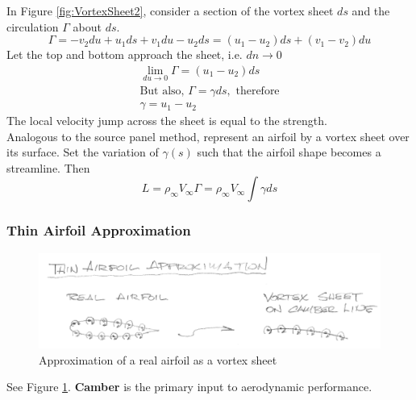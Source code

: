 \documentclass[draft=false, titlepage]{article}
\begin{document}

In Figure \ref{fig:VortexSheet2}, consider a section of the vortex sheet $ds$ and the circulation $\Gamma$ about $ds$.
\begin{equation*}
    \Gamma = -v_2du + u_1ds + v_1du - u_2ds = (u_1-u_2)ds + (v_1-v_2)du
\end{equation*}
Let the top and bottom approach the sheet, i.e. $dn \rightarrow 0$
\begin{gather*}
    \lim\limits_{du \rightarrow 0} \Gamma = (u_1-u_2)ds\\
    \text{But also, } \Gamma = \gamma ds, \text{ therefore}\\
    \gamma = u_1-u_2
\end{gather*}
The local velocity jump across the sheet is equal to the strength.\\
Analogous to the source panel method, represent an airfoil by a vortex sheet over its surface. Set the variation of $\gamma(s)$ such that the airfoil shape becomes a streamline. Then
\begin{equation*}
    L = \rho_\infty V_\infty \Gamma = \rho_\infty V_\infty \int\gamma ds
\end{equation*}
\subsubsection{Thin Airfoil Approximation}
\begin{figure}[ht]
    \centering
    \includegraphics[width=0.7\linewidth]{Figures/thinAirfoilApproximation.PNG}
    \caption{Approximation of a real airfoil as a vortex sheet}
    \label{fig:ThinAirfoilApproximation}
\end{figure}
See Figure \ref{fig:ThinAirfoilApproximation}. \textbf{Camber} is the primary input to aerodynamic performance.
\end{document}
